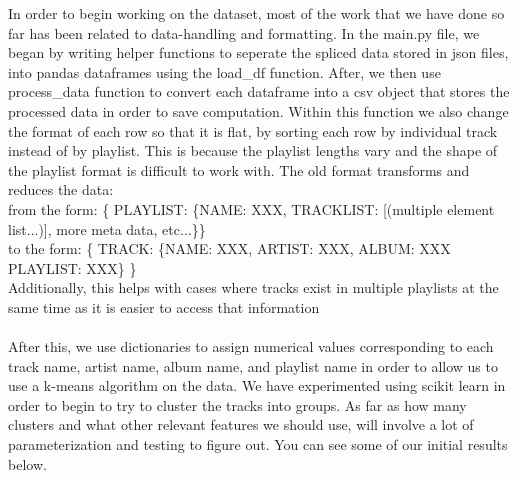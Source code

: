 \documentclass{article}
\begin{document}
In order to begin working on the dataset, most of the work that we have done so far has been related to data-handling and formatting. In the main.py file, we began by writing helper functions to seperate the
spliced data stored in json files, into pandas dataframes using the load\_df function. After, we then use process\_data function to convert each dataframe into a csv object that stores the processed data in order
to save computation. Within this function we also change the format of each row so that it is flat, by sorting each row by individual track instead of by playlist. This is because the playlist lengths vary and
the shape of the playlist format is difficult to work with. The old format transforms and reduces the data: \\
from the form: \{ PLAYLIST: \{NAME: XXX, TRACKLIST: [(multiple element list...)], more meta data, etc...\}\} \\to the form: \{ TRACK: \{NAME: XXX, ARTIST: XXX, ALBUM: XXX PLAYLIST: XXX\} \} \\
Additionally, this helps with cases where tracks exist in multiple playlists at the same time as it is easier to access that information \\ \\

After this, we use dictionaries to assign numerical values corresponding to each track name, artist name, album name, and playlist name in order to allow us to use a k-means algorithm on the data. We have experimented
using scikit learn in order to begin to try to cluster the tracks into groups. As far as how many clusters and what other relevant features we should use, will involve a lot of parameterization and testing to figure out.
You can see some of our initial results below. \\ \\
\end{document}
